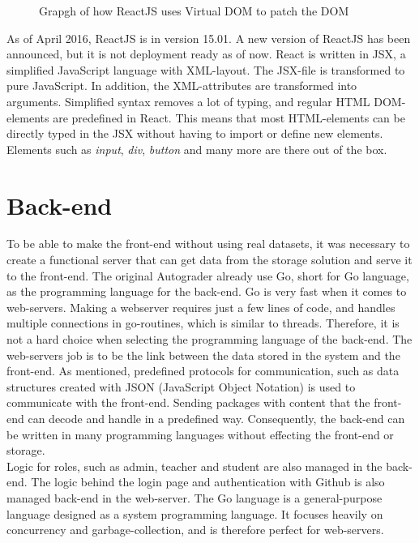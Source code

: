 \begin{figure}[h]
\centering
{}
\caption{Grapgh of how ReactJS uses Virtual DOM to patch the DOM}
\end{figure}

As of April 2016, ReactJS is in version 15.01. A new version of ReactJS has been announced, but it is not deployment ready as of now. React is written in JSX, a simplified JavaScript language with XML-layout. The JSX-file is transformed to pure JavaScript. In addition, the XML-attributes are transformed into arguments. Simplified syntax removes a lot of typing, and regular HTML DOM-elements are predefined in React. This means that most HTML-elements can be directly typed in the JSX without having to import or define new elements. Elements such as \emph{input}, \emph{div}, \emph{button} and many more are there out of the box.

\section{Back-end}
To be able to make the front-end without using real datasets, it was necessary to create a functional server that can get data from the storage solution and serve it to the front-end. The original Autograder already use Go, short for Go language, as the programming language for the back-end. Go is very fast when it comes to web-servers. Making a webserver requires just a few lines of code, and handles multiple connections in go-routines, which is similar to threads. Therefore, it is not a hard choice when selecting the programming language of the back-end. The web-servers job is to be the link between the data stored in the system and the front-end. As mentioned, predefined protocols for communication, such as data structures created with JSON (JavaScript Object Notation) is used to communicate with the front-end. Sending packages with content that the front-end can decode and handle in a predefined way. Consequently, the back-end can be written in many programming languages without effecting the front-end or storage.
\\Logic for roles, such as admin, teacher and student are also managed in the back-end. The logic behind the login page and authentication with Github is also managed back-end in the web-server. The Go language is a general-purpose language designed as a system programming language. It focuses heavily on concurrency and garbage-collection, and is therefore perfect for web-servers.

